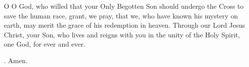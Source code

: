\lettrine[lines=3]{O}{} O God, who willed that your Only Begotten Son
should undergo the Cross to save the human race,
grant, we pray,
that we, who have known his mystery on earth,
may merit the grace of his redemption in heaven.
Through our Lord Jesus Christ, your Son,
who lives and reigns with you in the unity of the Holy Spirit,
one God, for ever and ever. \par \Rbar. Amen.
